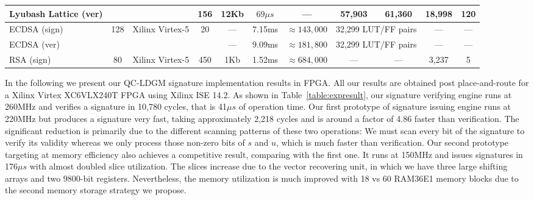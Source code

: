 \documentclass[10pt,journal,compsoc]{IEEEtran}
\begin{document}
\begin{table}[!t]
\begin{minipage}{\textwidth}
\begin{tabular}{lcccccccccc}
Lyubash Lattice (ver)\cite{guneysu2012practical}& & &156&12Kb&$69\mu s$&---&57,903&61,360&18,998&120\\
\hline
ECDSA (sign)\cite{glas2011prime}&\multirow{2}{*}{128}& \multirow{2}{*}{Xilinx Virtex-5}&\multirow{2}{*}{20}& --- &7.15ms& $\approx 143,000$ &\multicolumn{2}{c}{32,299 LUT/FF pairs}&---&---\\
ECDSA (ver)\cite{glas2011prime}&&&&---&9.09ms& $\approx 181,800$ & \multicolumn{2}{c}{32,299 LUT/FF pairs}&---&---\\
RSA (sign)\cite{suzuki2011maximize} & 80 & Xilinx Virtex-5 & 450 & 1Kb & 1.52ms& $\approx 684,000$ & --- &--- &3,237& 5\\
\hline
\end{tabular}
\end{minipage}
\end{table}

In the following we present our QC-LDGM signature implementation results in FPGA. All our results are obtained post place-and-route for a Xilinx Virtex XC6VLX240T FPGA using Xilinx ISE 14.2. As shown in Table~\ref{table:expresult}, our signature verifying engine runs at 260MHz and verifies a signature in 10,780 cycles, that is 41$\mu s$ of operation time. Our first prototype of signature issuing engine runs at 220MHz but produces a signature very fast, taking approximately 2,218 cycles and is around a factor of 4.86 faster than verification. The significant reduction is primarily due to the different scanning patterns of these two
operations: We must scan every bit of the signature to verify its validity whereas we only process those non-zero bits of $s$ and $u$, which is much faster than verification. Our second prototype targeting at memory efficiency also achieves a competitive result, comparing with the first one. It runs at 150MHz and issues signatures in 176$\mu s$ with almost doubled slice utilization. The slices increase due to the vector recovering unit, in which we have three large shifting arrays and two 9800-bit registers. Nevertheless, the memory utilization is much improved with 18 vs 60 RAM36E1 memory blocks due to the second memory storage strategy we propose.
\end{document}
